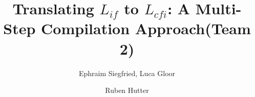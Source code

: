 \newcommand{\groupnumber}{Team 2}

\title{\texorpdfstring{Translating $L_{if}$ to $L_{cfi}$: A Multi-Step Compilation Approach\newline (\groupnumber)}
{Translating $L_{if}$ to $L_{cfi}$: A Multi-Step Compilation Approach (\groupnumber)}} %
\author{Ephraim Siegfried, Luca Gloor \and  Ruben Hutter} %

\institute{\lectureInstitute} %

\begin{report}
    
    
    
    
    
    
    
    
\end{report}

